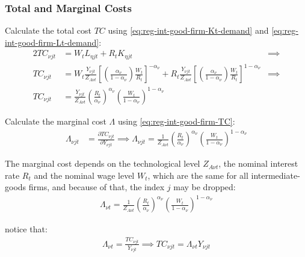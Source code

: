 \documentclass[
thesis.tex
]{subfiles}
\begin{document}
\subsubsection*{Total and Marginal Costs}

Calculate the total cost $TC$ using \ref{eq:reg-int-good-firm-Kt-demand} and \ref{eq:reg-int-good-firm-Lt-demand}:
\begin{alignat}{2}
	TC_{\nu jt} & = W_t L_{\eta jt} + R_t K_{\eta jt} &\implies \nonumber \\
	TC_{\nu jt} & = W_t \frac{Y_{\nu jt}}{Z_{A\nu t}} \left[ \left( \frac{{\alpha_\nu}}{1-{\alpha_\nu}} \right) \frac{W_t}{R_t} \right]^{-{\alpha_\nu}} + R_t \frac{Y_{\nu jt}}{Z_{A\nu t}} \left[ \left( \frac{{\alpha_\nu}}{1-{\alpha_\nu}} \right) \frac{W_t}{R_t} \right]^{1-{\alpha_\nu}} &\implies \nonumber \\
	TC_{\nu jt} & = \frac{Y_{\nu jt}}{Z_{A\nu t}} \left( \frac{R_t}{{\alpha_\nu}} \right)^{{\alpha_\nu}} \left( \frac{W_t}{1-{\alpha_\nu}} \right)^{1-{\alpha_\nu}} \label{eq:reg-int-good-firm-TC}
\end{alignat}


Calculate the marginal cost $\Lambda$ using \ref{eq:reg-int-good-firm-TC}: 
\begin{align}
	\Lambda_{\nu jt} & = \frac{\partial TC_{\nu jt}}{\partial Y_{\nu jt}} \implies 
	\Lambda_{\nu jt} = \frac{1}{Z_{A\nu t}} \left( \frac{R_t}{{\alpha_\nu}} \right)^{{\alpha_\nu}} \left( \frac{W_t}{1-{\alpha_\nu}} \right)^{1-{\alpha_\nu}} \label{eq:reg-int-good-firm-MC}
\end{align}

The marginal cost depends on the technological level $Z_{A\nu t}$, the nominal interest rate $R_t$ and the nominal wage level $W_t$, which are the same for all intermediate-goods firms, and because of that, the index $j$ may be dropped:
\begin{align}
	\label{eq:reg-int-good-firm-MC-2}
	\Lambda_{\nu t} = \frac{1}{Z_{A\nu t}} \left( \frac{R_t}{{\alpha_\nu}} \right)^{{\alpha_\nu}} \left( \frac{W_t}{1-{\alpha_\nu}} \right)^{1-{\alpha_\nu}}
\end{align}

notice that:
\begin{align}
	\label{eq:reg-int-good-firm-TC-MC}
	\Lambda_{\nu t} = \frac{TC_{\nu jt}}{Y_{\nu jt}} \implies 
	TC_{\nu jt} = \Lambda_{\nu t} Y_{\nu jt}
\end{align}

\end{document}
